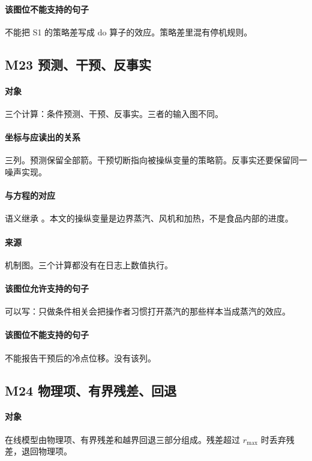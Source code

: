 \paragraph{该图位不能支持的句子}
不能把 S1 的策略差写成 $\mathrm{do}$ 算子的效应。策略差里混有停机规则。

\subsection{M23 预测、干预、反事实}
\paragraph{对象}
三个计算：条件预测、干预、反事实。三者的输入图不同。

\paragraph{坐标与应读出的关系}
三列。预测保留全部箭。干预切断指向被操纵变量的策略箭。反事实还要保留同一噪声实现。

\paragraph{与方程的对应}
语义继承 \cite{pearl2009}。本文的操纵变量是边界蒸汽、风机和加热，不是食品内部的进度。

\paragraph{来源}
机制图。三个计算都没有在日志上数值执行。

\paragraph{该图位允许支持的句子}
可以写：只做条件相关会把操作者习惯打开蒸汽的那些样本当成蒸汽的效应。

\paragraph{该图位不能支持的句子}
不能报告干预后的冷点位移。没有该列。

\subsection{M24 物理项、有界残差、回退}
\paragraph{对象}
在线模型由物理项、有界残差和越界回退三部分组成。残差超过 $r_{\max}$ 时丢弃残差，退回物理项。

